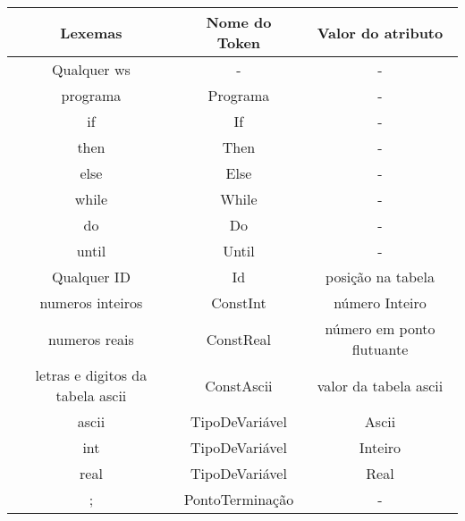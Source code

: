 \documentclass[11pt]{article}
\begin{document}
\begin{table}[H]
    \begin{tabular}{c|c|c}
        \hline
        \textbf{Lexemas}   & \textbf{Nome do Token}   & \textbf{Valor do atributo}  \\
        \hline
        Qualquer ws        &        -                 &            -                \\
        \hline
        programa           &        Programa          &            -                \\
        \hline
         if                &        If                &            -                \\
        \hline
         then              &        Then              &            -                \\
        \hline
         else              &        Else              &            -                \\
        \hline
         while             &        While             &            -                \\
        \hline
         do                &        Do                &            -                \\
        \hline
         until             &        Until             &            -                \\
        \hline
        \hline
         Qualquer ID       &      Id                  &           posição na tabela          \\
        \hline
         numeros inteiros            &      ConstInt             &           número Inteiro             \\
        \hline
         numeros reais               &      ConstReal            &          número em ponto flutuante  \\
        \hline
         letras e digitos da tabela ascii     &      ConstAscii           &          valor da tabela ascii  \\
        \hline
        \hline
         ascii             &      TipoDeVariável      &           Ascii                      \\
        \hline
         int               &      TipoDeVariável      &           Inteiro                    \\
        \hline
         real              &      TipoDeVariável      &           Real                       \\
        \hline
        \hline
         ;                 &        PontoTerminação   &            -                \\

\end{tabular}
\end{table}
\end{document}
